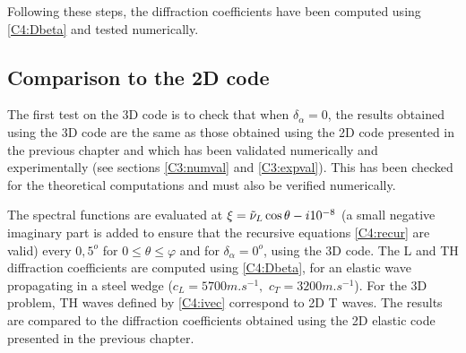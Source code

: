 Following these steps, the diffraction coefficients have been computed using \eqref{C4:Dbeta} and tested numerically.

\subsection{Comparison to the 2D code}
The first test on the 3D code is to check that when $\delta_{\alpha}=0$, the results obtained using the 3D code are the same as those obtained using the 2D code presented in the previous chapter and which has been validated numerically and experimentally (see sections \ref{C3:numval} and \ref{C3:expval}). This has been checked for the theoretical computations and must also be verified numerically.

The spectral functions are evaluated at $\xi=\tilde{\nu}_L\cos\theta -i10^{-8}$ (a small negative imaginary part is added to ensure that the recursive equations \eqref{C4:recur} are valid) every $0,5^o$ for $0\leq\theta\leq \varphi$ and for $\delta_{\alpha} =0^o$,  using the 3D code. The L and TH diffraction coefficients are computed using \eqref{C4:Dbeta}, for an elastic wave propagating in a steel wedge ($c_L=5700m.s^{-1}, \, \, c_T=3200m.s^{-1}$). For the 3D problem, TH waves defined by \eqref{C4:ivec} correspond to 2D T waves. The results are compared to the diffraction coefficients obtained using the 2D elastic code presented in the previous chapter.

